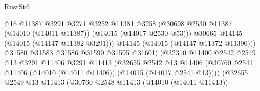 \begin{lexlean}{RustStd}
\begin{coremodule}
                                              @16
                                              @11387
                                              @3291
                                              @3271
                                              @3252
                                              @11381
                                              @3258
                                              (@30698
                                                @2530
                                                @11387
                                                (@14010 (@14011 @11387))
                                                (@14015 (@14017 @2530 @53)))
                                              @30665
                                              @14145
                                              (@14015 (@14147 @11382 @3291)))
                                            @14145
                                            (@14015 (@14147 @11372 @11390)))
                                          @31580
                                          @31583
                                          @31586
                                          @31590
                                          @31595
                                          @31601)
                                        (@32310
                                          @11400
                                          @2542
                                          @2549
                                          @13
                                          @3291
                                          @11406
                                          @3291
                                          @11413
                                          (@32655
                                            @2542
                                            @13
                                            @11406
                                            (@30760
                                              @2541
                                              @11406
                                              (@14010 (@14011 @11406))
                                              (@14015 (@14017 @2541 @13))))
                                          (@32655
                                            @2549
                                            @13
                                            @11413
                                            (@30760
                                              @2548
                                              @11413
                                              (@14010 (@14011 @11413))

\end{coremodule}
\end{lexlean}
